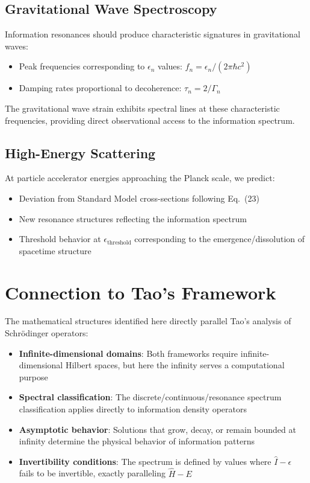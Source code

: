 \documentclass[12pt]{article}
\begin{document}
\subsection{Gravitational Wave Spectroscopy}

Information resonances should produce characteristic signatures in gravitational waves:
\begin{itemize}
\item Peak frequencies corresponding to $\epsilon_n$ values: $f_n = \epsilon_n/(2\pi \hbar c^2)$
\item Damping rates proportional to decoherence: $\tau_n = 2/\Gamma_n$
\end{itemize}

The gravitational wave strain exhibits spectral lines at these characteristic frequencies, providing direct observational access to the information spectrum.

\subsection{High-Energy Scattering}

At particle accelerator energies approaching the Planck scale, we predict:
\begin{itemize}
\item Deviation from Standard Model cross-sections following Eq.~(23)
\item New resonance structures reflecting the information spectrum
\item Threshold behavior at $\epsilon_{\text{threshold}}$ corresponding to the emergence/dissolution of spacetime structure
\end{itemize}

\section{Connection to Tao's Framework}

The mathematical structures identified here directly parallel Tao's analysis of Schrödinger operators:

\begin{itemize}
\item \textbf{Infinite-dimensional domains}: Both frameworks require infinite-dimensional Hilbert spaces, but here the infinity serves a computational purpose
\item \textbf{Spectral classification}: The discrete/continuous/resonance spectrum classification applies directly to information density operators
\item \textbf{Asymptotic behavior}: Solutions that grow, decay, or remain bounded at infinity determine the physical behavior of information patterns
\item \textbf{Invertibility conditions}: The spectrum is defined by values where $\hat{I} - \epsilon$ fails to be invertible, exactly paralleling $\hat{H} - E$
\end{itemize}
\end{document}

